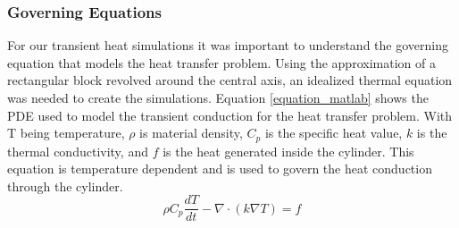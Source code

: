 \subsubsection{Governing Equations}
For our transient heat simulations it was important to understand the governing equation that models the heat transfer problem. Using the approximation of a rectangular block revolved around the central axis, an idealized thermal equation was needed to create the simulations. Equation \ref{equation_matlab} shows the PDE used to model the transient conduction for the heat transfer problem. With T being temperature, $\rho$ is material density, $C_{p}$ is the specific heat value, $k$ is the thermal conductivity, and $f$ is the heat generated inside the cylinder. This equation is temperature dependent and is used to govern the heat conduction through the cylinder. 
\begin{equation}
    \rho C_p \frac{dT}{dt}   - \nabla \cdot (k \nabla T) = f 
    \label{equation_matlab}
\end{equation}

